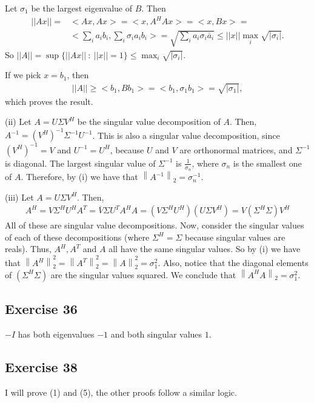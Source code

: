 \documentclass[11.5pt, letterpaper, bibtotoc,
    tablecaptionabove, figurecaptionabove]{article}
\newcommand{\norm}[1]{\left\lVert#1\right\rVert}
\begin{document}
Let $\sigma_1$ be the largest eigenvalue of $B$.
Then
\begin{align*}
    ||Ax|| =& <Ax,Ax> = <x,A^HAx> = 
    <x,Bx> =\\ &<\sum_ia_ib_i,\sum_i\sigma_ia_ib_i> =
    \sqrt{\sum_ia_i\sigma_i\bar{a}_i} \leq
    ||x||\max_i\sqrt{|\sigma_i|}.
\end{align*}
So $||A||=\sup\{||Ax||\ :\ ||x||=1\}\leq\max_i\sqrt{|\sigma_i|}$.

If we pick $x=b_1$, then
\begin{align*}
    ||A||\geq <b_1,Bb_1> = <b_1,\sigma_1b_1> = \sqrt{|\sigma_1|},
\end{align*}
which proves the result.

(ii)
Let $A = U \Sigma V^H$ be the singular value decomposition of $A$. 
Then, $A^{-1} = (V^H)^{-1} \Sigma^{-1} U^{-1}$. 
This is also a singular value decomposition, since $(V^H)^{-1} = V$ and 
$U^{-1} = U^H$, because $U$ and $V$ are orthonormal matrices, and $\Sigma^{-1}$ is diagonal. 
The largest singular value of $\Sigma^{-1}$ is $\frac{1}{\sigma_n}$, where $\sigma_n$ is the smallest one of $A$. 
Therefore, by (i) we have that  $\norm{A^{-1}}_2 = \sigma^{-1}_n$.

(iii)
Let $A = U \Sigma V^H$. 
Then,
\begin{align*}
    A^H = V \Sigma^H U^H 
	A^T = \overline{V} \Sigma U^T 
	A^H A = (V \Sigma^H U^H) (U \Sigma V^H) = V (\Sigma^H \Sigma) V^H
\end{align*}
All of these are singular value decompositions. 
Now, consider the singular values of each of these decompositions (where $\Sigma^H = \Sigma$ because singular values are reals). 
Thus, $A^H, A^T$ and $A$ all have the same singular values.
So by (i) we have that $\norm{A^H}^2_2 = \norm{A^T}^2_2 =  \norm{A}^2_2 = \sigma^2_1$. 
Also, notice that the diagonal elements of $(\Sigma^H \Sigma)$ are the singular values squared. 
We conclude that $\norm{A^H A}_2  = \sigma^2_1$.

\subsection*{Exercise 36}
$-I$ has both eigenvalues $-1$ and both singular values $1$.

\subsection*{Exercise 38}
I will prove (1) and (5), the other proofs follow a similar logic.
\end{document}
